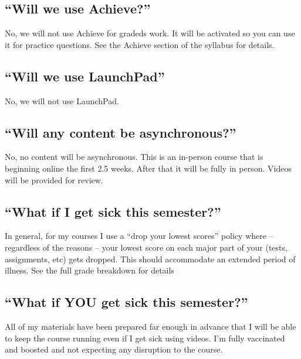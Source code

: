 \documentclass[
]{book}
\begin{document}
\hypertarget{will-we-use-achieve}{%
\subsection{``Will we use Achieve?''}\label{will-we-use-achieve}}

No, we will not use Achieve for gradeds work. It will be activated so you can use it for practice questions. See the Achieve section of the syllabus for details.

\hypertarget{will-we-use-launchpad}{%
\subsection{``Will we use LaunchPad''}\label{will-we-use-launchpad}}

No, we will not use LaunchPad.

\hypertarget{will-any-content-be-asynchronous}{%
\subsection{``Will any content be asynchronous?''}\label{will-any-content-be-asynchronous}}

No, no content will be asynchronous. This is an in-person course that is beginning online the first 2.5 weeks. After that it will be fully in person. Videos will be provided for review.

\hypertarget{what-if-i-get-sick-this-semester}{%
\subsection{``What if I get sick this semester?''}\label{what-if-i-get-sick-this-semester}}

In general, for my courses I use a ``drop your lowest scores'' policy where -- regardless of the reasons -- your lowest score on each major part of your (tests, assignments, etc) gets dropped. This should accommodate an extended period of illness. See the full grade breakdown for details

\hypertarget{what-if-you-get-sick-this-semester}{%
\subsection{``What if YOU get sick this semester?''}\label{what-if-you-get-sick-this-semester}}

All of my materials have been prepared far enough in advance that I will be able to keep the course running even if I get sick using videos. I'm fully vaccinated and boosted and not expecting any disruption to the course.
\end{document}
